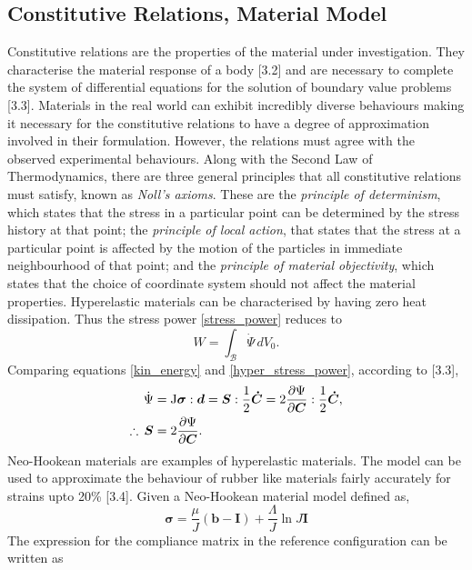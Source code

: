 \documentclass[../main.tex]{subfiles}
\begin{document}
\subsection{Constitutive Relations, Material Model}
Constitutive relations are the properties of the material under investigation. They characterise the material response of a body [3.2] and
 are necessary to complete the system of differential equations for the solution of boundary value problems [3.3]. Materials in the real world can exhibit incredibly diverse behaviours making it necessary for the constitutive relations to
 have a degree of approximation involved in their formulation. However, the relations must agree with the observed experimental behaviours. Along with the 
 Second Law of Thermodynamics, there are three general principles that all constitutive relations must satisfy, known as \emph{Noll's axioms}.
 These are the \emph{principle of determinism}, which states that the stress in a particular point can be determined by 
 the stress history at that point; the \emph{principle of local action},
 that states that the stress at a particular point is affected by the motion of the particles in
 immediate neighbourhood of that point; and the \emph{principle of material objectivity}, which states that the choice of coordinate
 system should not affect the material properties. 
Hyperelastic materials can be characterised by having zero heat dissipation. Thus the stress power \eqref{stress_power}
 reduces to
 \begin{equation}\label{hyper_stress_power}
    W = \int_{\mathcal{B}} \dot{\Psi}\,dV_{0}.
 \end{equation}
Comparing equations \eqref{kin_energy} and \eqref{hyper_stress_power}, according to [3.3],
 \begin{align}\label{S_is_Psi}
    \dot{\Psi} &= \mathrm{J} \boldsymbol{\sigma} : \mathrm{\boldsymbol{d}} = \mathrm{\boldsymbol{S}} : \frac{1}{2}\mathrm{\boldsymbol{\dot{C}}} = 2 \frac{\partial \Psi}{\partial \mathrm{\boldsymbol{C}}} : \frac{1}{2} \mathrm{\boldsymbol{\dot{C}}}, \notag\\
    \therefore \, \mathrm{\boldsymbol{S}}  &= 2 \frac{\partial \Psi}{\partial \mathrm{\boldsymbol{C}}}.
\end{align}
Neo-Hookean materials are examples of hyperelastic materials. The model can be used to approximate the behaviour of
 rubber like materials fairly accurately for strains upto 20\% [3.4]. Given a Neo-Hookean material model defined as,
\begin{equation} \label{neo_hookean_definition}
{\boldsymbol{\sigma} = \frac{\mu}{J}\left(\boldsymbol{b}-\boldsymbol{I}\right) + \frac{\Lambda}{J}\ln{J}\boldsymbol{I}}
\end{equation}
The expression for the compliance matrix in the reference configuration can be written as
\end{document}
